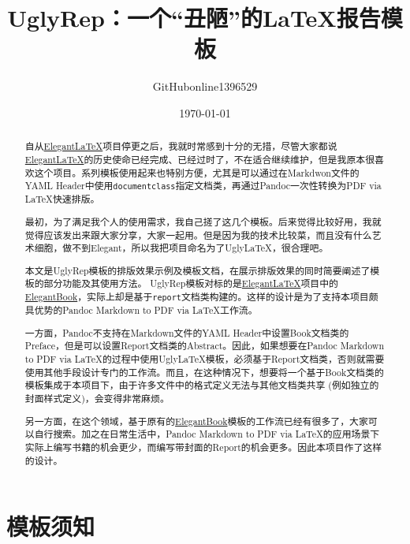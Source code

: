 \documentclass[12pt, green, textbook]{uglyrep}
\title{\bfseries UglyRep：一个“丑陋”的\LaTeX{}报告模板}
\author{GitHubonline1396529}
\date{\today}
\begin{document}
\maketitle
\begin{abstract}
  自从\href{https://github.com/ElegantLaTeX/}{Elegant\LaTeX}项目停更之后，我就时常感到十分的无措，尽管大家都说\href{https://github.com/ElegantLaTeX/}{Elegant\LaTeX}的历史使命已经完成、已经过时了，不在适合继续维护，但是我原本很喜欢这个项目。系列模板使用起来也特别方便，尤其是可以通过在Markdwon文件的YAML Header中使用\texttt{documentclass}指定文档类，再通过Pandoc一次性转换为PDF via \LaTeX{}快速排版。

  最初，为了满足我个人的使用需求，我自己搓了这几个模板。后来觉得比较好用，我就觉得应该发出来跟大家分享，大家一起用。但是因为我的技术比较菜，而且没有什么艺术细胞，做不到Elegant，所以我把项目命名为了Ugly\LaTeX{}，很合理吧。

  本文是UglyRep模板的排版效果示例及模板文档，在展示排版效果的同时简要阐述了模板的部分功能及其使用方法。%
  UglyRep模板对标的是\href{https://github.com/ElegantLaTeX/}{Elegant\LaTeX}项目中的\href{https://github.com/ElegantLaTeX/ElegantBook}{ElegantBook}，实际上却是基于\texttt{report}文档类构建的。这样的设计是为了支持本项目颇具优势的Pandoc Markdown to PDF via \LaTeX{}工作流。
  
  一方面，Pandoc不支持在Markdown文件的YAML Header中设置Book文档类的Preface，但是可以设置Report文档类的Abstract。因此，如果想要在Pandoc Markdown to PDF via \LaTeX{}的过程中使用Ugly\LaTeX{}模板，必须基于Report文档类，否则就需要使用其他手段设计专门的工作流。而且，在这种情况下，想要将一个基于Book文档类的模板集成于本项目下，由于许多文件中的格式定义无法与其他文档类共享 (例如独立的封面样式定义)，会变得非常麻烦。
  
  另一方面，在这个领域，基于原有的\href{https://github.com/ElegantLaTeX/ElegantBook}{ElegantBook}模板的工作流已经有很多了，大家可以自行搜索。加之在日常生活中，Pandoc Markdown to PDF via \LaTeX{}的应用场景下实际上编写书籍的机会更少，而编写带封面的Report的机会更多。因此本项目作了这样的设计。

\end{abstract}

\tableofcontents

\chapter{模板须知}
\end{document}
